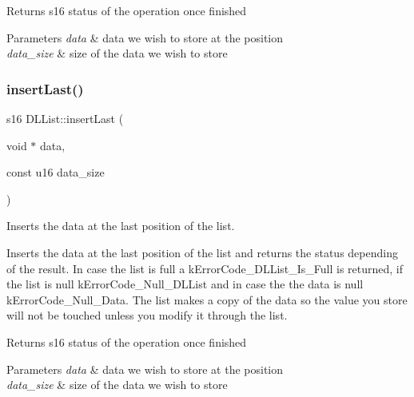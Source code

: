\begin{DoxyReturn}{Returns}
s16 status of the operation once finished 
\end{DoxyReturn}

\begin{DoxyParams}{Parameters}
{\em data} & data we wish to store at the position \\
\hline
{\em data\+\_\+size} & size of the data we wish to store \\
\hline
\end{DoxyParams}
\mbox{\label{class_d_l_list_a926e2bcf76d4372c1832e79ee1fb3097}} 
\subsubsection{\texorpdfstring{insert\+Last()}{insertLast()}}
{\footnotesize\ttfamily s16 D\+L\+List\+::insert\+Last (\begin{DoxyParamCaption}\item[{void $\ast$}]{data,  }\item[{const u16}]{data\+\_\+size }\end{DoxyParamCaption})}



Inserts the data at the last position of the list. 

Inserts the data at the last position of the list and returns the status depending of the result. In case the list is full a k\+Error\+Code\+\_\+\+D\+L\+List\+\_\+\+Is\+\_\+\+Full is returned, if the list is null k\+Error\+Code\+\_\+\+Null\+\_\+\+D\+L\+List and in case the the data is null k\+Error\+Code\+\_\+\+Null\+\_\+\+Data. The list makes a copy of the data so the value you store will not be touched unless you modify it through the list.

\begin{DoxyReturn}{Returns}
s16 status of the operation once finished 
\end{DoxyReturn}

\begin{DoxyParams}{Parameters}
{\em data} & data we wish to store at the position \\
\hline
{\em data\+\_\+size} & size of the data we wish to store \\
\hline
\end{DoxyParams}
\mbox{\label{class_d_l_list_a45b7bf2d077487db54b048c61229de0b}} 
